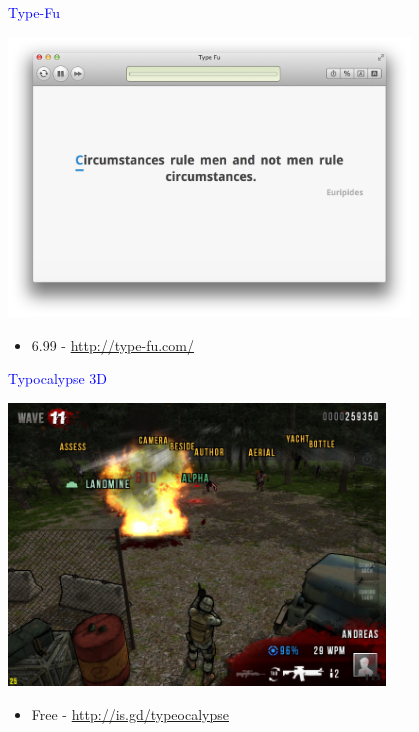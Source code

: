 \documentclass[landscape]{slides}
\begin{document}
\begin{slide}

    \textcolor{blue}{\Large{Type-Fu}}

    \centering

    \includegraphics[width=0.8\textwidth]{type-fu-screenshot}

    \begin{itemize}
        \item 6.99 - \url{http://type-fu.com/}
    \end{itemize}

\end{slide}


\begin{slide}

    \textcolor{blue}{\Large{Typocalypse 3D}}

    \centering

    \includegraphics[width=0.75\textwidth]{typocalypse-3d}

    \begin{itemize}
        \item Free - \url{http://is.gd/typeocalypse}
    \end{itemize}

\end{slide}
\end{document}
